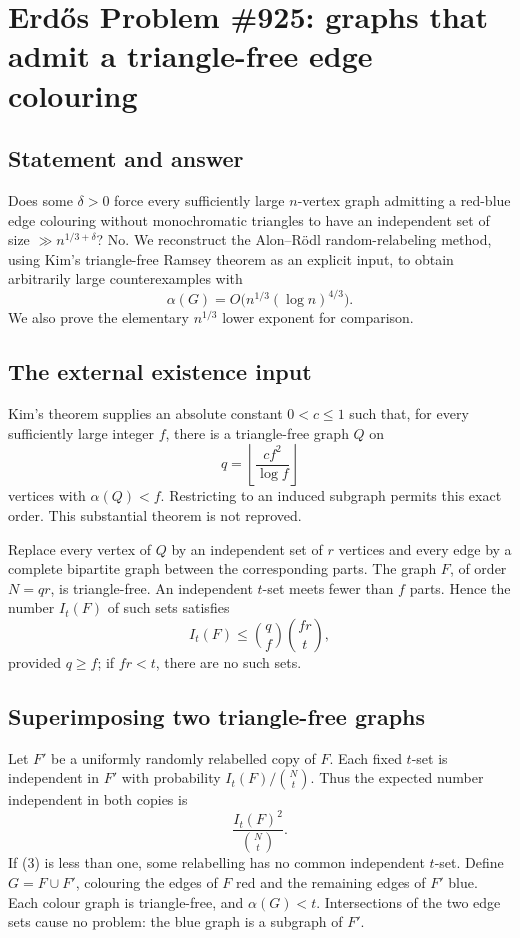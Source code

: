 \section*{Erd\H{o}s Problem \#925: graphs that admit a triangle-free edge colouring}
\subsection*{Statement and answer}
Does some \(\delta>0\) force every sufficiently large \(n\)-vertex graph admitting a red-blue edge colouring without monochromatic triangles to have an independent set of size \(\gg n^{1/3+\delta}\)?
No. We reconstruct the Alon--R\"odl random-relabeling method, using Kim's triangle-free Ramsey theorem as an explicit input, to obtain arbitrarily large counterexamples with
\[
\alpha(G)=O\bigl(n^{1/3}(\log n)^{4/3}\bigr). \tag{1}
\]
We also prove the elementary \(n^{1/3}\) lower exponent for comparison.

\subsection*{The external existence input}
Kim's theorem supplies an absolute constant \(0<c\leq1\) such that, for every sufficiently large integer \(f\), there is a triangle-free graph \(Q\) on
\[
q=\left\lfloor\frac{cf^2}{\log f}\right\rfloor
\]
vertices with \(\alpha(Q)<f\). Restricting to an induced subgraph permits this exact order. This substantial theorem is not reproved.

Replace every vertex of \(Q\) by an independent set of \(r\) vertices and every edge by a complete bipartite graph between the corresponding parts. The graph \(F\), of order \(N=qr\), is triangle-free. An independent \(t\)-set meets fewer than \(f\) parts. Hence the number \(I_t(F)\) of such sets satisfies
\[
I_t(F)\leq\binom qf\binom{fr}{t}, \tag{2}
\]
provided \(q\geq f\); if \(fr<t\), there are no such sets.

\subsection*{Superimposing two triangle-free graphs}
Let \(F'\) be a uniformly randomly relabelled copy of \(F\). Each fixed \(t\)-set is independent in \(F'\) with probability \(I_t(F)/\binom Nt\). Thus the expected number independent in both copies is
\[
\frac{I_t(F)^2}{\binom Nt}. \tag{3}
\]
If (3) is less than one, some relabelling has no common independent \(t\)-set. Define \(G=F\cup F'\), colouring the edges of \(F\) red and the remaining edges of \(F'\) blue. Each colour graph is triangle-free, and \(\alpha(G)<t\). Intersections of the two edge sets cause no problem: the blue graph is a subgraph of \(F'\).

